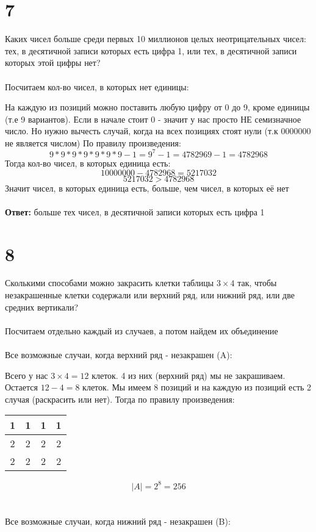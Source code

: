 \documentclass[a4paper,12pt]{article}
\begin{document}
\section*{7}
Каких чисел больше среди первых 10 миллионов целых неотрицательных чисел: тех, в десятичной записи которых есть цифра 1, или тех, в десятичной записи которых этой цифры нет?
\\\\
Посчитаем кол-во чисел, в которых нет единицы:


На каждую из позиций можно поставить любую цифру от 0 до 9, кроме единицы (т.е 9 вариантов). Если в начале стоит 0 - значит у нас просто НЕ семизначное число. Но нужно вычесть случай, когда на всех позициях стоят  нули (т.к 0000000 не является числом) По правилу произведения:
\[
9 * 9 * 9 * 9 * 9 * 9 * 9 - 1= 9^7 - 1 = 4782969 - 1 = 4782968
\]
Тогда кол-во чисел, в которых единица есть:
\[
10000000 - 4782968 = 5217032
\]
\[
5217032 > 4782968
\]
Значит чисел, в которых единица есть, больше, чем чисел, в которых её нет\\\\
\textbf{Ответ:} больше тех чисел, в десятичной записи которых есть цифра 1
\section*{8}
Сколькими способами можно закрасить клетки таблицы $3 \times 4$
так, чтобы незакрашенные клетки
содержали или верхний ряд, или нижний ряд, или две средних вертикали?
\\\\
Посчитаем отдельно каждый из случаев, а потом найдем их объединение
\\\\
Все возможные случаи, когда верхний ряд - незакрашен (A):

Всего у нас $3 \times 4 = 12 $ клеток.  4 из них (верхний ряд) мы не закрашиваем. Остается $12 - 4 = 8$ клеток. Мы имеем 8 позиций и на каждую из позиций есть 2 случая (раскрасить или нет). Тогда по правилу произведения: \\
\begin{center}
\begin{tabular}{|c|c|c|c|}
\hline
1 &1  &1  & 1\\
\hline
 2& 2 &2  & 2 \\
\hline
 2&2  & 2  & 2 \\
\hline
\end{tabular}
\end{center}
\[
|A| = 2 ^ 8 = 256
\]
\\\\
Все возможные случаи, когда нижний ряд - незакрашен (B):
\end{document}
